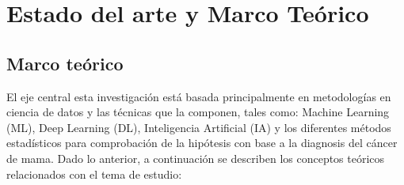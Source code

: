 \newpage
\chapter{Estado del arte y Marco Teórico}

\section{Marco teórico}

El eje central esta investigación está basada principalmente en metodologías en ciencia de datos y las técnicas que la componen, tales como:  Machine Learning (ML), Deep Learning (DL), Inteligencia Artificial (IA) y los diferentes métodos estadísticos para comprobación de la hipótesis con base a la diagnosis del cáncer de mama. Dado lo anterior, a continuación se describen los conceptos teóricos relacionados con el tema de estudio:   

